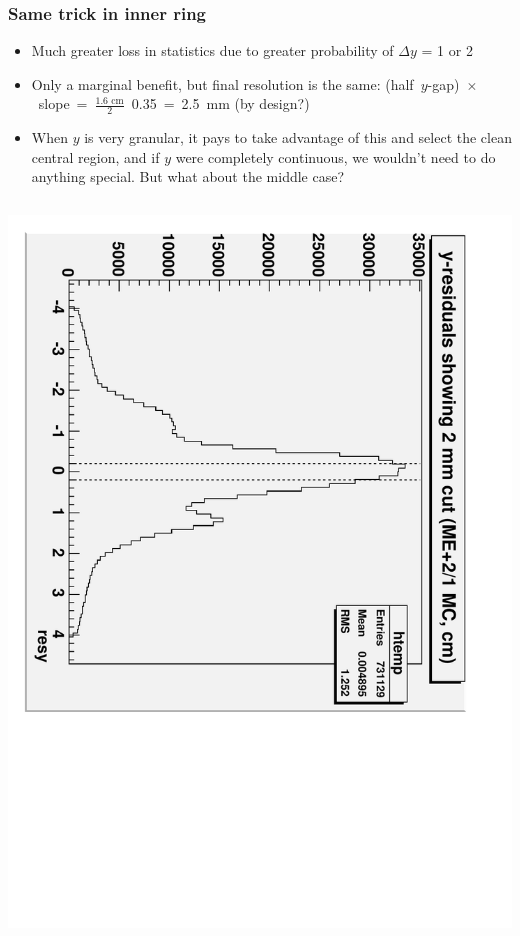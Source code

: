 \documentclass[compress]{beamer}
\begin{document}
\begin{frame}
\frametitle{Same trick in inner ring}
\scriptsize
\begin{itemize}
\item Much greater loss in statistics due to greater probability of $\Delta y$ = 1 or 2
\item Only a marginal benefit, but final resolution is the same: (half~$y$-gap)~$\times$~slope~=~$\frac{\mbox{1.6 cm}}{2}$~0.35~=~2.5~mm (by design?)
\item When $y$ is very granular, it pays to take advantage of this and
  select the clean central region, and if $y$ were completely
  continuous, we wouldn't need to do anything special.  But what about the middle case?
\end{itemize}

\vfill
\begin{columns}
\includegraphics[height=\linewidth, angle=90]{MC_residuals_detail2-yprojection_ME21.pdf}

\end{columns}
\end{frame}
\end{document}
